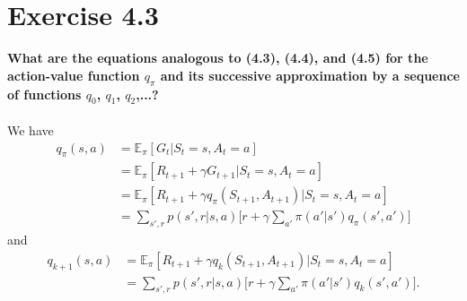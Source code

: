 \documentclass[a4paper,11pt]{article}
\numberwithin{equation}{section}
\theoremstyle{remark}
\newcommand{\E}{\mathbb E}
\begin{document}
\section{Exercise 4.3}

\textbf{What are the equations analogous to (4.3), (4.4), and (4.5) for the action-value function $q_\pi$ and its successive approximation by a sequence of functions $q_0$, $q_1$, $q_2$,...?}
\\ \\
We have
\begin{align*}
	q_\pi(s, a) & = \E_\pi [G_t | S_t=s, A_t=a] \\
				& = \E_\pi [R_{t+1} + \gamma G_{t+1} | S_t=s, A_t=a] \\
				& = \E_\pi [R_{t+1} + \gamma q_\pi(S_{t+1}, A_{t+1}) |  S_t=s, A_t=a] \\
				& = \sum_{s', r} p(s', r | s, a)\Big[ r + \gamma \sum_{a'} \pi(a' | s') q_\pi(s', a') \Big]
\end{align*}
and
\begin{align*}
	q_{k+1}(s, a) & = \E_\pi [R_{t+1} + \gamma q_k(S_{t+1}, A_{t+1}) |  S_t=s, A_t=a] \\
				  & = \sum_{s', r} p(s', r | s, a)\Big[ r + \gamma \sum_{a'} \pi(a' | s') q_k(s', a') \Big].
\end{align*}
\end{document}
